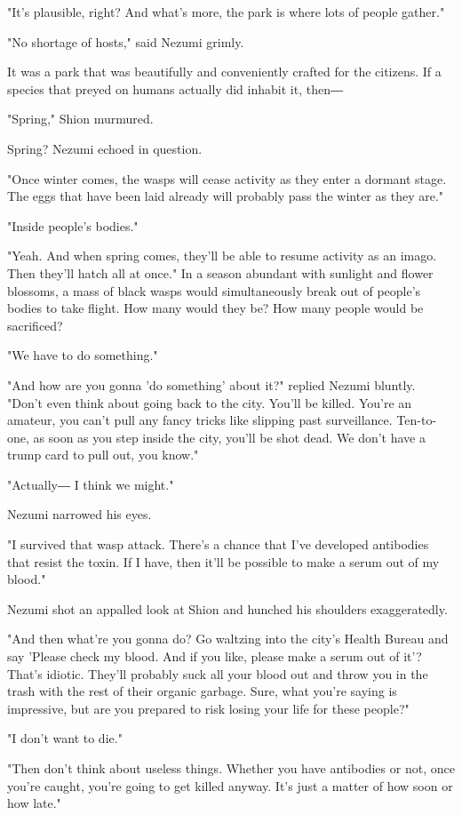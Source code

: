 "It's plausible, right? And what's more, the park is where lots of
people gather."

"No shortage of hosts," said Nezumi grimly.

It was a park that was beautifully and conveniently crafted for the
citizens. If a species that preyed on humans actually did inhabit it,
then―

"Spring," Shion murmured.

Spring? Nezumi echoed in question.

"Once winter comes, the wasps will cease activity as they enter a
dormant stage. The eggs that have been laid already will probably pass
the winter as they are."

"Inside people's bodies."

"Yeah. And when spring comes, they'll be able to resume activity as an
imago. Then they'll hatch all at once." In a season abundant with
sunlight and flower blossoms, a mass of black wasps would simultaneously
break out of people's bodies to take flight. How many would they be? How
many people would be sacrificed?

"We have to do something."

"And how are you gonna 'do something' about it?" replied Nezumi bluntly.
"Don't even think about going back to the city. You'll be killed. You're
an amateur, you can't pull any fancy tricks like slipping past
surveillance. Ten-to-one, as soon as you step inside the city, you'll be
shot dead. We don't have a trump card to pull out, you know."

"Actually― I think we might."

Nezumi narrowed his eyes.

"I survived that wasp attack. There's a chance that I've developed
antibodies that resist the toxin. If I have, then it'll be possible to
make a serum out of my blood."

Nezumi shot an appalled look at Shion and hunched his shoulders
exaggeratedly.

"And then what're you gonna do? Go waltzing into the city's Health
Bureau and say 'Please check my blood. And if you like, please make a
serum out of it'? That's idiotic. They'll probably suck all your blood
out and throw you in the trash with the rest of their organic garbage.
Sure, what you're saying is impressive, but are you prepared to risk
losing your life for these people?"

"I don't want to die."

"Then don't think about useless things. Whether you have antibodies or
not, once you're caught, you're going to get killed anyway. It's just a
matter of how soon or how late."

